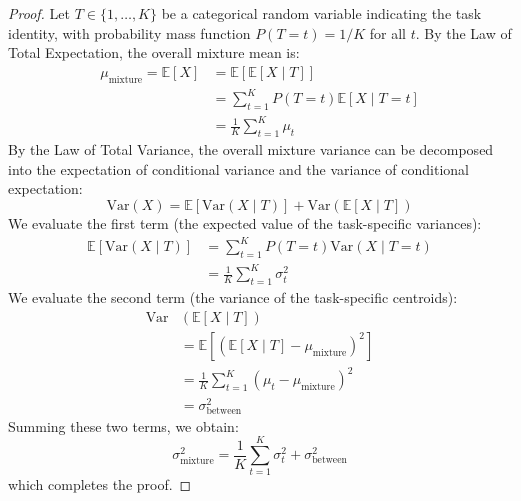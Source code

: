 \documentclass{article}
\theoremstyle{plain}
\theoremstyle{definition}
\theoremstyle{remark}
\begin{document}
\begin{proof}
Let $T \in \{1, \dots, K\}$ be a categorical random variable indicating the task identity, with probability mass function $P(T=t) = 1/K$ for all $t$. By the Law of Total Expectation, the overall mixture mean is:
\begin{align}
    \mu_{\text{mixture}} = \mathbb{E}[X] &= \mathbb{E}[\mathbb{E}[X \mid T]] \nonumber \\
    &= \sum_{t=1}^K P(T=t) \mathbb{E}[X \mid T=t] \nonumber \\
    &= \frac{1}{K} \sum_{t=1}^K \mu_t
\end{align}
By the Law of Total Variance, the overall mixture variance can be decomposed into the expectation of conditional variance and the variance of conditional expectation:
\begin{equation}
    \text{Var}(X) = \mathbb{E}[\text{Var}(X \mid T)] + \text{Var}(\mathbb{E}[X \mid T])
\end{equation}
We evaluate the first term (the expected value of the task-specific variances):
\begin{align}
    \mathbb{E}[\text{Var}(X \mid T)] &= \sum_{t=1}^K P(T=t) \text{Var}(X \mid T=t) \nonumber \\
    &= \frac{1}{K} \sum_{t=1}^K \sigma^2_t
\end{align}
We evaluate the second term (the variance of the task-specific centroids):
\begin{align}
    \text{Var} & (\mathbb{E}[X \mid T]) \nonumber \\
    &= \mathbb{E}\left[(\mathbb{E}[X \mid T] - \mu_{\text{mixture}})^2\right] \nonumber \\
    &= \frac{1}{K} \sum_{t=1}^K (\mu_t - \mu_{\text{mixture}})^2 \nonumber \\
    &= \sigma^2_{\text{between}}
\end{align}
Summing these two terms, we obtain:
\begin{equation}
    \sigma^2_{\text{mixture}} = \frac{1}{K} \sum_{t=1}^K \sigma^2_t + \sigma^2_{\text{between}}
\end{equation}
which completes the proof.
\end{proof}
\end{document}
